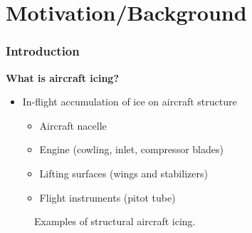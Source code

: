 \documentclass[9pt]{beamer}
\begin{document}
\section{Motivation/Background}
\label{sec-1}
\begin{frame}
\frametitle{Introduction}
\label{sec-1-1}

\textbf{What is aircraft icing?}
\begin{itemize}
\item In-flight accumulation of ice on aircraft structure
\begin{itemize}
\item Aircraft nacelle
\item Engine (cowling, inlet, compressor blades)
\item Lifting surfaces (wings and stabilizers)
\item Flight instruments (pitot tube)
\end{itemize}
\end{itemize}

\vspace*{-0.0cm}\begin{figure}
      \caption{Examples of structural aircraft icing.}
\end{figure}
\end{frame}
\end{document}
